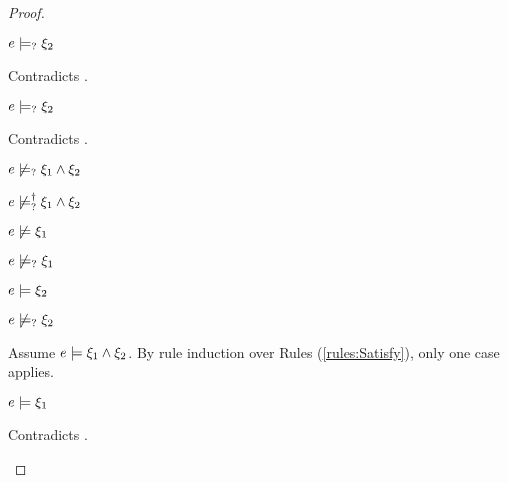 \begin{proof}
\begin{byCases}
\begin{byCases}
\begin{byCases}
        \item[\text{(\ref{rule:CMSAnd2})}]
            \begin{pfsteps*}
            \item $e \models_{?} \xi_2$ 
            \end{pfsteps*}
            Contradicts .
        \item[\text{(\ref{rule:CMSAnd3})}]
            \begin{pfsteps*}
            \item $e \models_{?} \xi_2$ 
            \end{pfsteps*}
            Contradicts .
        \end{byCases}
        \begin{pfsteps*}
        \item $e \not\models_{?} \xi_1 \wedge \xi_2$  
        \item $e \not\models_{?}^{\dag} \xi_1 \wedge \xi_2$ 
        \end{pfsteps*}
    \item[\cnotsatisfyormay{e}{\xi_1},\csatisfy{e}{\xi_2}]
        \begin{pfsteps*}
        \item $e \not\models \xi_1$  
        \item $e \not\models_{?} \xi_1$  
        \item $e \models \xi_2$  
        \item $e \not\models_{?} \xi_2$  
        \end{pfsteps*}
        Assume $e \models \xi_1 \wedge \xi_2$. By rule induction over Rules (\ref{rules:Satisfy}), only one case applies.
        \begin{byCases}
        \item[\text{(\ref{rule:CSAnd})}]
            \begin{pfsteps*}
            \item $e \models \xi_1$ 
            \end{pfsteps*}
            Contradicts .

\end{byCases}
\end{byCases}
\end{byCases}
\end{proof}
